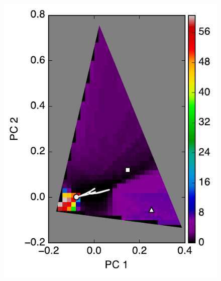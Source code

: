 \documentclass[iop,numberedappendix,apj,]{emulateapj}
\begin{document}
\begin{figure}[tbh!]
\begin{minipage}{0.33\hsize}
\begin{center}
\includegraphics[width=\hsize]{mockdata_90deg_3types2_t360_lc_noreg.pdf}
    \end{center}
     \end{minipage} 
   \begin{minipage}{0.33\hsize}
    \begin{center}

\end{center}
\end{minipage}
\end{figure}
\end{document}
